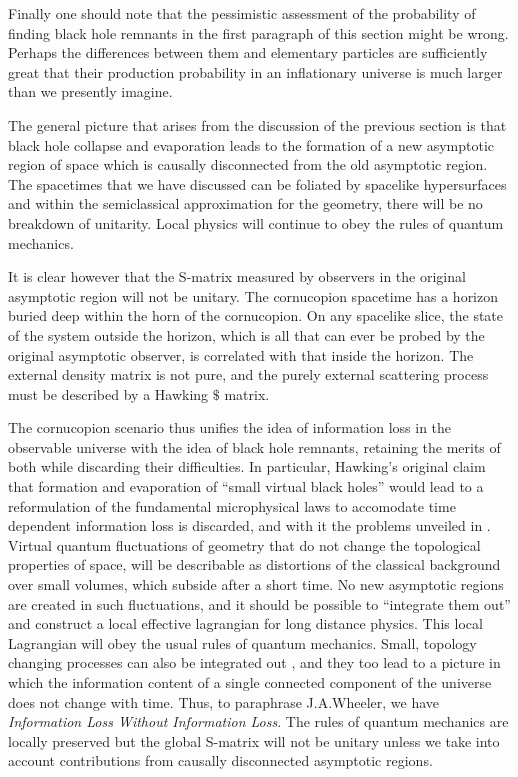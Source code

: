 Finally one should note that the pessimistic assessment of the probability of
finding black hole remnants
in the first paragraph of this section might be wrong.
Perhaps the differences between them and elementary particles
are sufficiently great that their production probability in an inflationary
universe
is much larger than we presently imagine.





The general picture that arises from the discussion of the previous
section is that black hole collapse and evaporation leads to the
formation of a new asymptotic region of space which is causally
disconnected from the old asymptotic region.  The spacetimes that we
have discussed can be foliated by spacelike hypersurfaces
 and within the semiclassical approximation for the
geometry, there will be no breakdown of unitarity.  Local physics will
continue to obey the rules of quantum mechanics.

It is clear however that the S-matrix measured by observers in the
original asymptotic region will not be unitary.  The cornucopion
spacetime has a horizon buried deep within the horn of the cornucopion.
On any spacelike slice, the state of the system
outside the horizon, which is all that can ever be probed by the
original asymptotic observer, is correlated with that inside the
horizon.  The external density matrix is not pure, and the purely
external scattering process must be described by a Hawking $\$$ matrix.

The cornucopion scenario thus unifies the idea of information loss in
the observable universe with the idea of black hole remnants, retaining
the merits of both while discarding their difficulties.  In particular,
Hawking's original claim that formation and evaporation of ``small
virtual black holes'' would lead to a reformulation of the fundamental
microphysical laws to accomodate time dependent information loss is
discarded, and with it the problems unveiled in \bps .  Virtual quantum
fluctuations of geometry that do not change the topological properties
of space, will be describable as distortions of the classical background
over small volumes, which subside after a short time.  No new asymptotic
regions are created in such fluctuations, and it should be possible to
``integrate them out'' and construct a local effective lagrangian for
long distance physics.  This local Lagrangian will obey the usual rules
of quantum mechanics.  Small, topology changing processes can also be
integrated out \worm , and they too lead to a picture in which the information
content of a single connected component of the universe does not change
with time.  Thus, to paraphrase J.A.Wheeler, we have {\it Information
Loss Without Information Loss}.  The rules of quantum mechanics are
locally preserved but the global S-matrix will not be unitary unless we
take into account contributions from causally disconnected asymptotic
regions.

